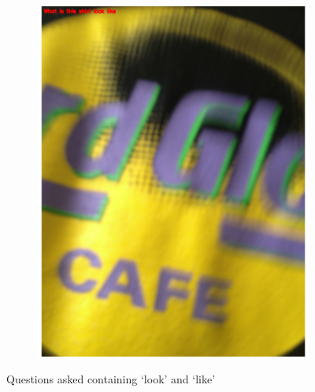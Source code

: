 \documentclass[sigconf]{acmart}
\begin{document}
\begin{figure}[hbp]
\begin{subfigure}[b]{0.45\columnwidth}
        \end{subfigure}%
        ~ 
        \begin{subfigure}[b]{0.45\columnwidth}
                \includegraphics[width=\textwidth]{images/impression_2.pdf}  
        \end{subfigure}%
       
        \caption{Questions asked containing `look' and `like'} 
        \label{fig:impression}
\end{figure}
\end{document}
